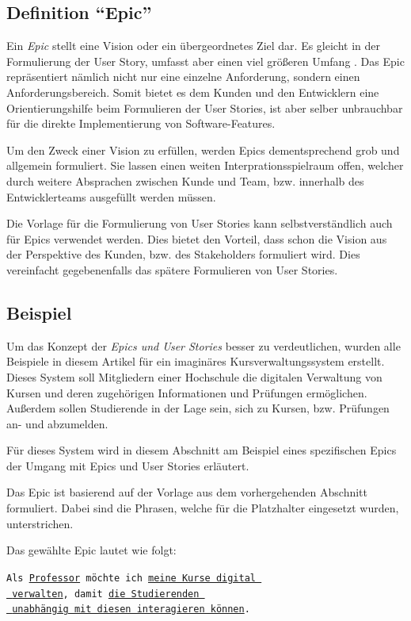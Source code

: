 \documentclass[acmtog]{acmart}
\begin{document}
\subsection{Definition ``Epic''}
Ein \emph{Epic} stellt eine Vision oder ein übergeordnetes Ziel dar.
Es gleicht in der Formulierung der User Story, umfasst aber einen viel größeren Umfang \cite[pp. 6, 14]{cohn_user_2004}.
Das Epic repräsentiert nämlich nicht nur eine einzelne Anforderung, sondern einen Anforderungsbereich.
Somit bietet es dem Kunden und den Entwicklern eine Orientierungshilfe beim Formulieren der User Stories,
ist aber selber unbrauchbar für die direkte Implementierung von Software-Features.

Um den Zweck einer Vision zu erfüllen, werden Epics dementsprechend grob und allgemein formuliert.
Sie lassen einen weiten Interprationsspielraum offen, welcher durch weitere Absprachen zwischen
Kunde und Team, bzw. innerhalb des Entwicklerteams ausgefüllt werden müssen.

Die Vorlage für die Formulierung von User Stories kann selbstverständlich auch für Epics verwendet werden.
Dies bietet den Vorteil, dass schon die Vision aus der Perspektive des Kunden, bzw. des Stakeholders formuliert
wird. Dies vereinfacht gegebenenfalls das spätere Formulieren von User Stories.

\subsection{Beispiel}
Um das Konzept der \emph{Epics und User Stories} besser zu verdeutlichen, wurden alle Beispiele in diesem
Artikel für ein imaginäres Kursverwaltungssystem erstellt.
Dieses System soll Mitgliedern einer Hochschule die digitalen Verwaltung von Kursen und deren zugehörigen Informationen
und Prüfungen ermöglichen.
Außerdem sollen Studierende in der Lage sein, sich zu Kursen, bzw. Prüfungen an- und abzumelden.

Für dieses System wird in diesem Abschnitt am Beispiel eines spezifischen Epics der Umgang mit Epics und User Stories erläutert.

Das Epic ist basierend auf der Vorlage aus dem vorhergehenden Abschnitt formuliert.
Dabei sind die Phrasen, welche für die Platzhalter eingesetzt wurden, unterstrichen.

Das gewählte Epic lautet wie folgt:

\vspace{1em}
\texttt{Als \underline{Professor} möchte ich \underline{meine Kurse digital }\\
	\hspace*{3em}\underline{ verwalten}, damit \underline{die Studierenden }\\
	\hspace*{4em} \underline{ unabhängig mit diesen interagieren können}.}
\vspace{1em}
\end{document}
